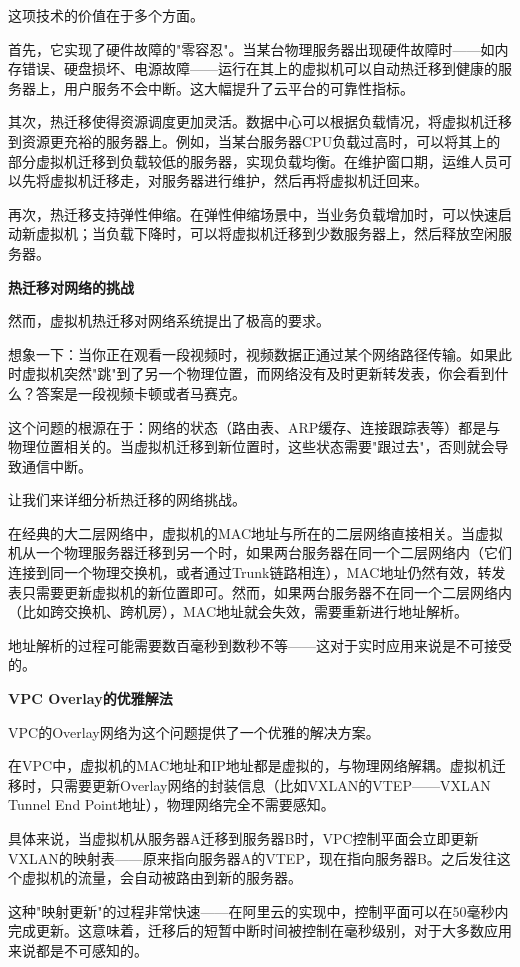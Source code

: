 这项技术的价值在于多个方面。

首先，它实现了硬件故障的"零容忍"。当某台物理服务器出现硬件故障时——如内存错误、硬盘损坏、电源故障——运行在其上的虚拟机可以自动热迁移到健康的服务器上，用户服务不会中断。这大幅提升了云平台的可靠性指标。

其次，热迁移使得资源调度更加灵活。数据中心可以根据负载情况，将虚拟机迁移到资源更充裕的服务器上。例如，当某台服务器CPU负载过高时，可以将其上的部分虚拟机迁移到负载较低的服务器，实现负载均衡。在维护窗口期，运维人员可以先将虚拟机迁移走，对服务器进行维护，然后再将虚拟机迁回来。

再次，热迁移支持弹性伸缩。在弹性伸缩场景中，当业务负载增加时，可以快速启动新虚拟机；当负载下降时，可以将虚拟机迁移到少数服务器上，然后释放空闲服务器。

\textbf{热迁移对网络的挑战}

然而，虚拟机热迁移对网络系统提出了极高的要求。

想象一下：当你正在观看一段视频时，视频数据正通过某个网络路径传输。如果此时虚拟机突然"跳"到了另一个物理位置，而网络没有及时更新转发表，你会看到什么？答案是一段视频卡顿或者马赛克。

这个问题的根源在于：网络的状态（路由表、ARP缓存、连接跟踪表等）都是与物理位置相关的。当虚拟机迁移到新位置时，这些状态需要"跟过去"，否则就会导致通信中断。

让我们来详细分析热迁移的网络挑战。

在经典的大二层网络中，虚拟机的MAC地址与所在的二层网络直接相关。当虚拟机从一个物理服务器迁移到另一个时，如果两台服务器在同一个二层网络内（它们连接到同一个物理交换机，或者通过Trunk链路相连），MAC地址仍然有效，转发表只需要更新虚拟机的新位置即可。然而，如果两台服务器不在同一个二层网络内（比如跨交换机、跨机房），MAC地址就会失效，需要重新进行地址解析。

地址解析的过程可能需要数百毫秒到数秒不等——这对于实时应用来说是不可接受的。

\textbf{VPC Overlay的优雅解法}

VPC的Overlay网络为这个问题提供了一个优雅的解决方案。

在VPC中，虚拟机的MAC地址和IP地址都是虚拟的，与物理网络解耦。虚拟机迁移时，只需要更新Overlay网络的封装信息（比如VXLAN的VTEP——VXLAN Tunnel End Point地址），物理网络完全不需要感知。

具体来说，当虚拟机从服务器A迁移到服务器B时，VPC控制平面会立即更新VXLAN的映射表——原来指向服务器A的VTEP，现在指向服务器B。之后发往这个虚拟机的流量，会自动被路由到新的服务器。

这种"映射更新"的过程非常快速——在阿里云的实现中，控制平面可以在50毫秒内完成更新。这意味着，迁移后的短暂中断时间被控制在毫秒级别，对于大多数应用来说都是不可感知的。

